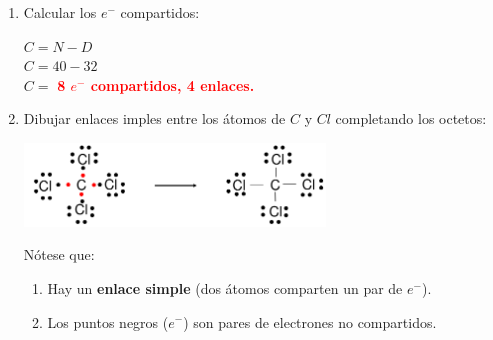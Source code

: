 \begin{enumerate}
            \item Calcular los $e^-$ compartidos:
                \begin{center}
                    $C = N - D$ \\[5pt]
                    $C = 40 - 32$ \\[5pt]
                    $C =$ \textcolor{red}{\textbf{8 $e^-$ compartidos, 4 enlaces.}}
                \end{center}
            \item Dibujar enlaces imples entre los átomos de $C$ y $Cl$ completando los octetos:
                \begin{center} \includegraphics[width=8cm]{./imagenes/dibujoLewisCCl4.png} \end{center}
                \sangria{} Nótese que:
                    \begin{enumerate}
                        \item Hay un \textbf{enlace simple} (dos átomos comparten un par de $e^-$).
                        \item Los puntos negros ($e^-$) son pares de electrones no compartidos.
                    \end{enumerate}
        \end{enumerate}

